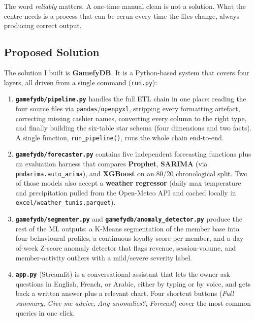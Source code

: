 \documentclass[12pt, a4paper]{report}
\begin{document}
The word \textit{reliably} matters. A one-time manual clean is not a solution.
What the centre needs is a process that can be rerun every time the files
change, always producing correct output.

\subsection{Proposed Solution}

The solution I built is \textbf{GamefyDB}. It is a Python-based system that
covers four layers, all driven from a single command (\texttt{run.py}):

\begin{enumerate}
  \item \textbf{\texttt{gamefydb/pipeline.py}} handles the full ETL chain in one
        place: reading the four source files via \texttt{pandas}/\texttt{openpyxl},
        stripping every formatting artefact, correcting missing cashier names,
        converting every column to the right type, and finally building the
        six-table star schema (four dimensions and two facts). A single function,
        \texttt{run\_pipeline()}, runs the whole chain end-to-end.

  \item \textbf{\texttt{gamefydb/forecaster.py}} contains five independent
        forecasting functions plus an evaluation harness that compares
        \textbf{Prophet}, \textbf{SARIMA} (via \texttt{pmdarima.auto\_arima}),
        and \textbf{XGBoost} on an 80/20 chronological split. Two of those
        models also accept a \textbf{weather regressor} (daily max temperature
        and precipitation pulled from the Open-Meteo API and cached locally in
        \texttt{excel/weather\_tunis.parquet}).

  \item \textbf{\texttt{gamefydb/segmenter.py}} and
        \textbf{\texttt{gamefydb/anomaly\_detector.py}} produce the rest of the
        ML outputs: a K-Means segmentation of the member base into four
        behavioural profiles, a continuous loyalty score per member, and a
        day-of-week Z-score anomaly detector that flags revenue, session-volume,
        and member-activity outliers with a mild/severe severity label.

  \item \textbf{\texttt{app.py}} (Streamlit) is a conversational assistant that
        lets the owner ask questions in English, French, or Arabic, either by
        typing or by voice, and gets back a written answer plus a relevant
        chart. Four shortcut buttons (\textit{Full summary}, \textit{Give me
        advice}, \textit{Any anomalies?}, \textit{Forecast}) cover the most
        common queries in one click.
\end{enumerate}
\end{document}
